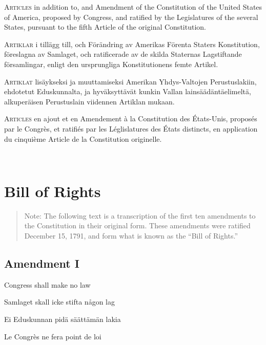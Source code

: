 \documentclass[a4paper,landscape,12pt]{article}
\begin{document}
\begin{minipage}[t]{0.22\textwidth}
\textsc{Articles} in addition to, and Amendment of the Constitution of the United States of America, proposed by Congress, and ratified by the Legislatures of the several States, pursuant to the fifth Article of the original Constitution.
\end{minipage}\textwidth
\begin{minipage}[t]{0.22\textwidth}
\textsc{Artiklar} i tillägg till, och Förändring av Amerikas Förenta Staters Konstitution, föreslagna av Samlaget, och ratificerade av de skilda Staternas Lagstiftande församlingar, enligt den ursprungliga Konstitutionens femte Artikel.
\end{minipage}\textwidth
\begin{minipage}[t]{0.22\textwidth}
\textsc{Artiklat} lisäykseksi ja muuttamiseksi Amerikan Yhdys-Valtojen Perustuslakiin, ehdotetut Eduskunnalta, ja hyväksyttävät kunkin Vallan lainsäädäntäelimeltä, alkuperäisen Perustuslain viidennen Artiklan mukaan.
\end{minipage}\textwidth
\begin{minipage}[t]{0.22\textwidth}
\textsc{Articles} en ajout et en Amendement à la Constitution des États-Unis, proposés par le Congrès, et ratifiés par les Léglislatures des États distincts, en application du cinquième Article de la Constitution originelle.
\end{minipage}

~

\section*{Bill of Rights}
\begin{quote}\small{}
Note: The following text is a transcription of the first ten amendments to the Constitution in their original form. These amendments were ratified December 15, 1791, and form what is known as the ``Bill of Rights.''
\end{quote}
\subsection*{Amendment I}
\begin{minipage}[t]{0.22\textwidth}
Congress shall make no law
\end{minipage}\textwidth
\begin{minipage}[t]{0.22\textwidth}
Samlaget skall icke stifta någon lag
\end{minipage}\textwidth
\begin{minipage}[t]{0.22\textwidth}
Ei Eduskunnan pidä säättämän lakia
\end{minipage}\textwidth
\begin{minipage}[t]{0.22\textwidth}
Le Congrès ne fera point de loi
\end{minipage}
\end{document}

